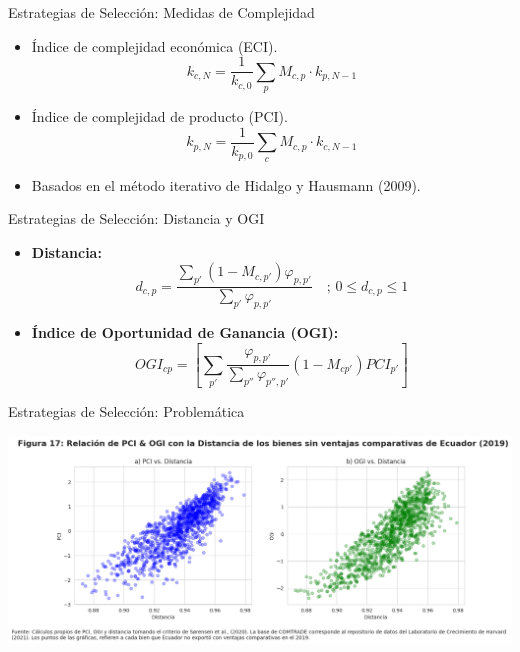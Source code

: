 \documentclass{beamer}
\begin{document}
\begin{frame}{Estrategias de Selección: Medidas de Complejidad}
    \begin{itemize}
        \item Índice de complejidad económica (ECI).
        \[
        k_{c,N} = \frac{1}{k_{c,0}} \sum_{p} M_{c,p} \cdot k_{p,N-1}

        \]
        \item Índice de complejidad de producto (PCI).
        \[
        k_{p,N} = \frac{1}{k_{p,0}} \sum_{c} M_{c,p} \cdot k_{c,N-1}
        \]
        \item Basados en el método iterativo de Hidalgo y Hausmann (2009).
    \end{itemize}
\end{frame}


\begin{frame}{Estrategias de Selección: Distancia y OGI}
    \begin{itemize}
        \item \textbf{Distancia:}
        \begin{equation} \tag{13}
        d_{c,p} = \frac{\sum_{p'} (1 - M_{c,p'}) \varphi_{p,p'}}{\sum_{p'} \varphi_{p,p'}} \quad \text{; } 0 \leq d_{c,p} \leq 1
        \end{equation}

        \item \textbf{Índice de Oportunidad de Ganancia (OGI):}
        \begin{equation} \tag{15}
        OGI_{cp} = \left[\sum_{p'}\frac{\varphi_{p,p'}}{\sum_{p''}\varphi_{p'',p'}}(1-M_{cp'})PCI_{p'} \right]
        \end{equation}
    \end{itemize}
\end{frame}

\begin{frame}{Estrategias de Selección: Problemática}

    \begin{center}
        \includegraphics[width=1.05\textwidth]{Figura17.png}
    \end{center}
\end{frame}
\end{document}
